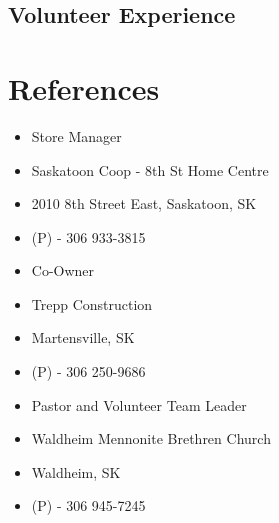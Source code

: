 \documentclass[11pt,letterpaper,sans]{moderncv}        %
\begin{document}
\subsection{Volunteer Experience}



\section{References}
{
  \begin{itemize}
    \item Store Manager
    \item Saskatoon Coop - 8th St Home Centre
    \item 2010 8th Street East, Saskatoon, SK
    \item (P) - 306 933-3815
  \end{itemize}
}

{
  \begin{itemize}
    \item Co-Owner
    \item Trepp Construction
    \item Martensville, SK
    \item (P) - 306 250-9686
  \end{itemize}
}

{
  \begin{itemize}
    \item Pastor and Volunteer Team Leader
    \item Waldheim Mennonite Brethren Church
    \item Waldheim, SK
    \item (P) - 306 945-7245
  \end{itemize}
}

\end{document}
